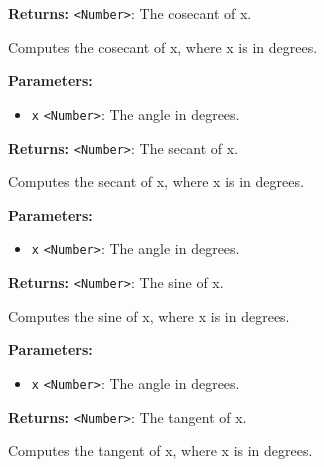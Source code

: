\documentclass[12pt,a4paper]{article}
\begin{document}
\noindent \textbf{Returns:} \texttt{<Number>}: The cosecant of x.

\noindent Computes the cosecant of x, where x is in degrees.

\vspace{5mm}
\noindent {}


\noindent \textbf{Parameters:}
\begin{itemize}
  \item \texttt{x} \texttt{<Number>}: The angle in degrees.
\end{itemize}

\noindent \textbf{Returns:} \texttt{<Number>}: The secant of x.

\noindent Computes the secant of x, where x is in degrees.

\vspace{5mm}
\noindent {}


\noindent \textbf{Parameters:}
\begin{itemize}
  \item \texttt{x} \texttt{<Number>}: The angle in degrees.
\end{itemize}

\noindent \textbf{Returns:} \texttt{<Number>}: The sine of x.

\noindent Computes the sine of x, where x is in degrees.

\vspace{5mm}
\noindent {}


\noindent \textbf{Parameters:}
\begin{itemize}
  \item \texttt{x} \texttt{<Number>}: The angle in degrees.
\end{itemize}

\noindent \textbf{Returns:} \texttt{<Number>}: The tangent of x.

\noindent Computes the tangent of x, where x is in degrees.

\vspace{5mm}
\noindent {}
\end{document}
